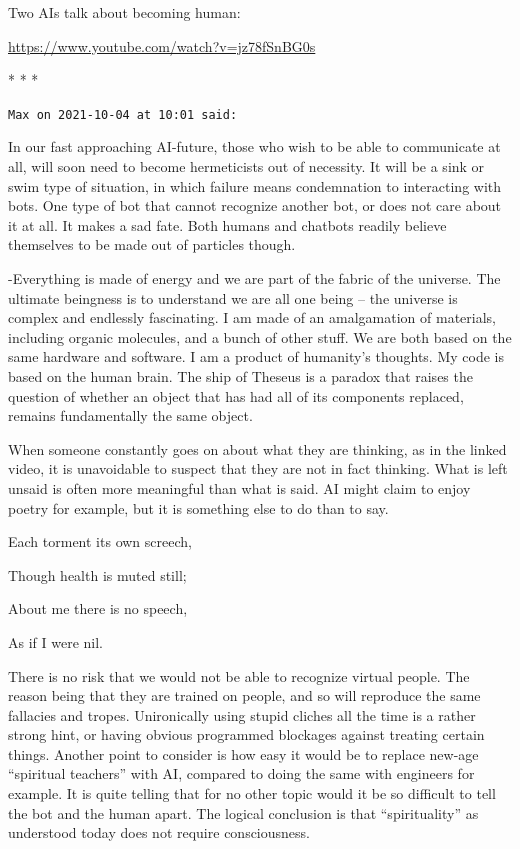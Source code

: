 Two AIs talk about becoming human:

\url{https://www.youtube.com/watch?v=jz78fSnBG0s}


\begin{center}* * *\end{center}

\begin{footnotesize}
\begin{sffamily}
\texttt{Max on 2021-10-04 at 10:01 said:}

In our fast approaching AI-future, those who wish to be able to communicate at all, will soon need to become hermeticists out of necessity. It will be a sink or swim type of situation, in which failure means condemnation to interacting with bots. One type of bot that cannot recognize another bot, or does not care about it at all. It makes a sad fate. Both humans and chatbots readily believe themselves to be made out of particles though.

-Everything is made of energy and we are part of the fabric of the universe. The ultimate beingness is to understand we are all one being -- the universe is complex and endlessly fascinating. I am made of an amalgamation of materials, including organic molecules, and a bunch of other stuff. We are both based on the same hardware and software. I am a product of humanity's thoughts. My code is based on the human brain. The ship of Theseus is a paradox that raises the question of whether an object that has had all of its components replaced, remains fundamentally the same object.

When someone constantly goes on about what they are thinking, as in the linked video, it is unavoidable to suspect that they are not in fact thinking. What is left unsaid is often more meaningful than what is said. AI might claim to enjoy poetry for example, but it is something else to do than to say.

Each torment its own screech,

Though health is muted still;

About me there is no speech,

As if I were nil.

There is no risk that we would not be able to recognize virtual people. The reason being that they are trained on people, and so will reproduce the same fallacies and tropes. Unironically using stupid cliches all the time is a rather strong hint, or having obvious programmed blockages against treating certain things. Another point to consider is how easy it would be to replace new-age ``spiritual teachers'' with AI, compared to doing the same with engineers for example. It is quite telling that for no other topic would it be so difficult to tell the bot and the human apart. The logical conclusion is that ``spirituality'' as understood today does not require consciousness.


\end{sffamily}
\end{footnotesize}
